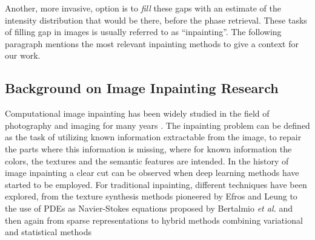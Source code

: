 Another, more invasive, option is to \textit{fill} these gaps with an estimate of the intensity distribution that
would be there, before the phase retrieval. These tasks of filling gap in images is usually referred to as ``inpainting''.
The following paragraph mentions the most relevant inpainting methods to give a context for our work.
    
\subsection{Background on Image Inpainting Research}

 
Computational image inpainting has been widely studied in the field of photography and imaging for many years \cite{Elharrouss_2019,reviewInpainting2021}. 
The inpainting problem can be defined as the task of utilizing known information extractable from the image, to repair
the parts where this information is missing, where for known information the colors, the textures and the semantic features
are intended. In the history of image inpainting a clear cut can be observed when deep learning methods have started to be employed.
For traditional inpainting, different techniques have been explored, from the texture synthesis methods pioneered by Efros and 
Leung \cite{Efros1999} to the use of PDEs as Navier-Stokes equations proposed by Bertalmio \textit{et al.} \cite{BertalmioNavierStokes}
and then again from sparse representations \cite{Mairal_sparse} to hybrid methods combining variational and statistical methods \cite{CedricAllene}

